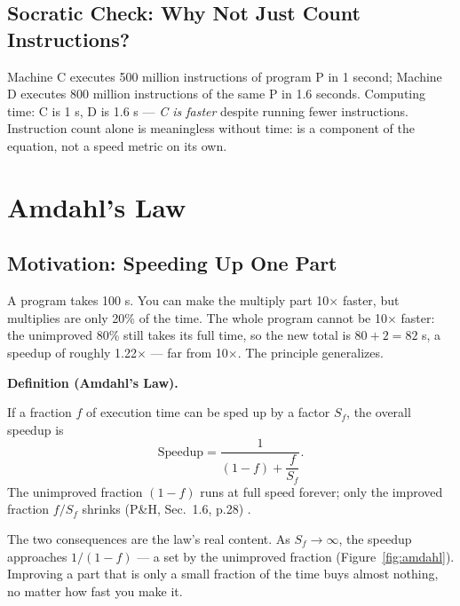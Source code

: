 \documentclass[11pt]{article}
\newenvironment{definitionbox}[1]{%
  \par\noindent\textbf{Definition (#1).}\ \itshape
}{\par\vspace{0.3em}}
\begin{document}
\subsection{Socratic Check: Why Not Just Count Instructions?}

Machine C executes 500 million instructions of program P in 1 second; Machine D executes 800 million instructions of the same P in 1.6 seconds. Computing time: C is 1 s, D is 1.6 s --- \emph{C is faster} despite running fewer instructions. Instruction count alone is meaningless without time:  is a component of the equation, not a speed metric on its own.

\section{Amdahl's Law}
\label{sec:amdahl}

\subsection{Motivation: Speeding Up One Part}

A program takes 100 s. You can make the multiply part 10$\times$ faster, but multiplies are only 20\% of the time. The whole program cannot be 10$\times$ faster: the unimproved 80\% still takes its full time, so the new total is $80 + 2 = 82$ s, a speedup of roughly 1.22$\times$ --- far from 10$\times$. The principle generalizes.

\begin{definitionbox}{Amdahl's Law}
If a fraction $f$ of execution time can be sped up by a factor $S_f$, the overall speedup is
\[
  \text{Speedup} = \frac{1}{(1-f) + \dfrac{f}{S_f}}.
\]
The unimproved fraction $(1-f)$ runs at full speed forever; only the improved fraction $f/S_f$ shrinks (P\&H, Sec.~1.6, p.28) \cite{PattersonHennessy2017_computer_organization_design}.
\end{definitionbox}

The two consequences are the law's real content. As $S_f \to \infty$, the speedup approaches $1/(1-f)$ --- a  set by the unimproved fraction (Figure~\ref{fig:amdahl}). Improving a part that is only a small fraction of the time buys almost nothing, no matter how fast you make it.
\end{document}
